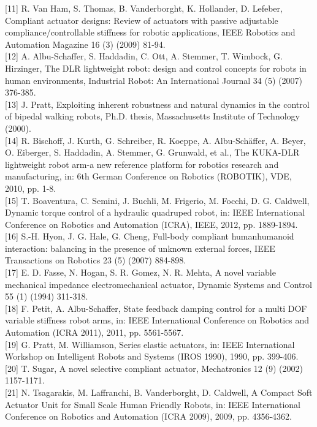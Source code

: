 \documentclass[10pt]{article}
\begin{document}
[11] R. Van Ham, S. Thomas, B. Vanderborght, K. Hollander, D. Lefeber, Compliant actuator designs: Review of actuators with passive adjustable compliance/controllable stiffness for robotic applications, IEEE Robotics and Automation Magazine 16 (3) (2009) 81-94.\\[0pt]
[12] A. Albu-Schaffer, S. Haddadin, C. Ott, A. Stemmer, T. Wimbock, G. Hirzinger, The DLR lightweight robot: design and control concepts for robots in human environments, Industrial Robot: An International Journal 34 (5) (2007) 376-385.\\[0pt]
[13] J. Pratt, Exploiting inherent robustness and natural dynamics in the control of bipedal walking robots, Ph.D. thesis, Massachusetts Institute of Technology (2000).\\[0pt]
[14] R. Bischoff, J. Kurth, G. Schreiber, R. Koeppe, A. Albu-Schäffer, A. Beyer, O. Eiberger, S. Haddadin, A. Stemmer, G. Grunwald, et al., The KUKA-DLR lightweight robot arm-a new reference platform for robotics research and manufacturing, in: 6th German Conference on Robotics (ROBOTIK), VDE, 2010, pp. 1-8.\\[0pt]
[15] T. Boaventura, C. Semini, J. Buchli, M. Frigerio, M. Focchi, D. G. Caldwell, Dynamic torque control of a hydraulic quadruped robot, in: IEEE International Conference on Robotics and Automation (ICRA), IEEE, 2012, pp. 1889-1894.\\[0pt]
[16] S.-H. Hyon, J. G. Hale, G. Cheng, Full-body compliant humanhumanoid interaction: balancing in the presence of unknown external forces, IEEE Transactions on Robotics 23 (5) (2007) 884-898.\\[0pt]
[17] E. D. Fasse, N. Hogan, S. R. Gomez, N. R. Mehta, A novel variable mechanical impedance electromechanical actuator, Dynamic Systems and Control 55 (1) (1994) 311-318.\\[0pt]
[18] F. Petit, A. Albu-Schaffer, State feedback damping control for a multi DOF variable stiffness robot arms, in: IEEE International Conference on Robotics and Automation (ICRA 2011), 2011, pp. 5561-5567.\\[0pt]
[19] G. Pratt, M. Williamson, Series elastic actuators, in: IEEE International Workshop on Intelligent Robots and Systems (IROS 1990), 1990, pp. 399-406.\\[0pt]
[20] T. Sugar, A novel selective compliant actuator, Mechatronics 12 (9) (2002) 1157-1171.\\[0pt]
[21] N. Tsagarakis, M. Laffranchi, B. Vanderborght, D. Caldwell, A Compact Soft Actuator Unit for Small Scale Human Friendly Robots, in: IEEE International Conference on Robotics and Automation (ICRA 2009), 2009, pp. 4356-4362.\\[0pt]
\end{document}
